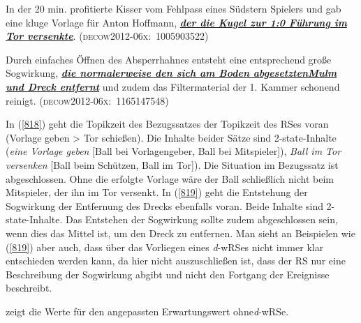 \begin{exe}
	\ex\label{818} 

	In der 20 min. profitierte Kisser vom Fehlpass eines Südstern Spielers und gab eine kluge Vorlage für Anton Hoffmann, \ul{\textbf{\textit{der die Kugel zur 1:0 Führung im Tor versenkte}}}.
	\hbox{}\hfill\hbox{\scshape(decow2012-06x: 1005903522)}
\end{exe}

\begin{exe}
	\ex\label{819} 

	Durch einfaches Öffnen des Absperrhahnes entsteht eine entsprechend große Sogwirkung, \ul{\textbf{\textit{die normalerweise den sich am Boden abgesetzten\linebreak Mulm und Dreck entfernt}}} und zudem das 				Filtermaterial der 1. Kammer schonend reinigt.                                       	
	\hfill\hbox{\scshape(decow2012-06x: 1165147548)}
\end{exe} 		            							            
In (\ref{818}) geht die Topikzeit des Bezugssatzes der Topikzeit des RSes voran (Vorlage geben > Tor schießen). Die Inhalte beider Sätze sind 2-state-Inhalte (\textit{eine Vorlage geben} [Ball bei Vorlagengeber, Ball bei Mitspieler]), \textit{Ball im Tor versenken} [Ball beim Schützen, Ball im Tor]). Die Situation im Bezugssatz ist abgeschlossen. Ohne die erfolgte Vorlage wäre der Ball schließlich nicht beim Mitspieler, der ihn im Tor versenkt. In (\ref{819}) geht die Entstehung der Sogwirkung der Entfernung des Drecks ebenfalls voran. Beide Inhalte sind 2-state-Inhalte. Das Entstehen der Sogwirkung sollte zudem abgeschlossen sein, wenn dies das Mittel ist, um den Dreck zu entfernen. Man sieht an Beispielen wie (\ref{819}) aber auch, dass über das Vorliegen eines \textit{d}-wRSes nicht immer klar entschieden werden kann, da hier nicht auszuschließen ist, dass der RS nur eine Beschreibung der Sogwirkung abgibt und nicht den Fortgang der Ereignisse beschreibt. 

 zeigt die Werte für den angepassten Erwartungswert ohne\linebreak \textit{d}-wRSe.

